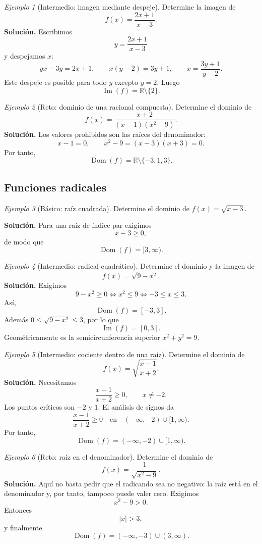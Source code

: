 \documentclass[12pt]{article}
\theoremstyle{remark}
\newtheorem{ejemplo}{Ejemplo}[section]
\newcommand{\R}{\mathbb{R}}
\newcommand{\Dom}{\operatorname{Dom}}
\newcommand{\Ima}{\operatorname{Im}}
\begin{document}
\begin{ejemplo}[Intermedio: imagen mediante despeje]
Determine la imagen de
\[
f(x)=\frac{2x+1}{x-3}.
\]
\textbf{Solución.} Escribimos
\[
y=\frac{2x+1}{x-3}
\]
y despejamos $x$:
\[
yx-3y=2x+1,
\qquad x(y-2)=3y+1,
\qquad x=\frac{3y+1}{y-2}.
\]
Este despeje es posible para todo $y$ excepto $y=2$. Luego
\[
\boxed{\Ima(f)=\R\setminus\{2\}}.
\]
\end{ejemplo}

\begin{ejemplo}[Reto: dominio de una racional compuesta]
Determine el dominio de
\[
f(x)=\frac{x+2}{(x-1)(x^2-9)}.
\]
\textbf{Solución.} Los valores prohibidos son las raíces del denominador:
\[
x-1=0,\qquad x^2-9=(x-3)(x+3)=0.
\]
Por tanto,
\[
\boxed{\Dom(f)=\R\setminus\{-3,1,3\}}.
\]
\end{ejemplo}

\subsection{Funciones radicales}

\begin{ejemplo}[Básico: raíz cuadrada]
Determine el dominio de $f(x)=\sqrt{x-3}$.

\textbf{Solución.} Para una raíz de índice par exigimos
\[
x-3\ge0,
\]
de modo que
\[
\boxed{\Dom(f)=[3,\infty)}.
\]
\end{ejemplo}

\begin{ejemplo}[Intermedio: radical cuadrático]
Determine el dominio y la imagen de
\[
f(x)=\sqrt{9-x^2}.
\]
\textbf{Solución.} Exigimos
\[
9-x^2\ge0\Longleftrightarrow x^2\le9\Longleftrightarrow -3\le x\le3.
\]
Así,
\[
\boxed{\Dom(f)=[-3,3]}.
\]
Además $0\le\sqrt{9-x^2}\le3$, por lo que
\[
\boxed{\Ima(f)=[0,3]}.
\]
Geométricamente es la semicircunferencia superior $x^2+y^2=9$.
\end{ejemplo}

\begin{ejemplo}[Intermedio: cociente dentro de una raíz]
Determine el dominio de
\[
f(x)=\sqrt{\frac{x-1}{x+2}}.
\]
\textbf{Solución.} Necesitamos
\[
\frac{x-1}{x+2}\ge0,
\qquad x\neq-2.
\]
Los puntos críticos son $-2$ y $1$. El análisis de signos da
\[
\frac{x-1}{x+2}\ge0
\quad\text{en}\quad
(-\infty,-2)\cup[1,\infty).
\]
Por tanto,
\[
\boxed{\Dom(f)=(-\infty,-2)\cup[1,\infty)}.
\]
\end{ejemplo}

\begin{ejemplo}[Reto: raíz en el denominador]
Determine el dominio de
\[
f(x)=\frac{1}{\sqrt{x^2-9}}.
\]
\textbf{Solución.} Aquí no basta pedir que el radicando sea no negativo: la raíz está en el denominador y, por tanto, tampoco puede valer cero. Exigimos
\[
x^2-9>0.
\]
Entonces
\[
|x|>3,
\]
y finalmente
\[
\boxed{\Dom(f)=(-\infty,-3)\cup(3,\infty)}.
\]
\end{ejemplo}
\end{document}
